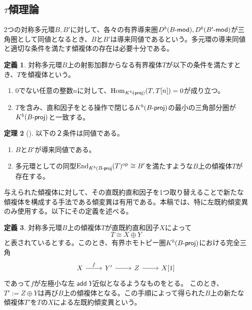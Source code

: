 \documentclass[a4paper,uplatex,dvipdfmx]{jsarticle}
\theoremstyle{definition}
\newtheorem{theorem}{定理}[section]
\newtheorem{definition}[theorem]{定義}
\newcommand{\lmod}{\operatorname{\mathsf{\hspace{-2pt}-mod}}}
\newcommand{\lproj}{\operatorname{\mathsf{\hspace{-2pt}-proj}}}
\newcommand{\opo}{\operatorname{\mathrm{op}}}
\newcommand{\End}{\operatorname{End}\nolimits}
\newcommand{\Hom}{\operatorname{Hom}\nolimits}
\newcommand{\add}{\operatorname{\mathsf{add}}}
\begin{document}
\subsection{\texorpdfstring{\(\tau\)}{τ}傾理論}
2つの対称多元環\(B,B'\)に対して、各々の有界導来圏\(D^b(B\lmod), D^b(B'\lmod)\)が三角圏として同値となるとき、\(B\)と\(B'\)は導来同値であるという。多元環の導来同値と適切な条件を満たす傾複体の存在は必要十分である。
\begin{definition}
  対称多元環\(B\)上の射影加群からなる有界複体\(T\)が以下の条件を満たすとき、\(T\)を傾複体という。
  \begin{enumerate}
    \item \(0\)でない任意の整数\(n\)に対して、\(\Hom_{K^b(\lproj)}(T,T[n])=0\)が成り立つ。
    \item \(T\)を含み、直和因子をとる操作で閉じる\(K^b(B\lproj)\)の最小の三角部分圏が\(K^b(B\lproj)\)と一致する。
  \end{enumerate}
\end{definition}
\begin{theorem}[{\cite{MR1002456}}]\label{Ric Derived eq}
  以下の２条件は同値である。
  \begin{enumerate}
    \item \(B\)と\(B'\)が導来同値である。
    \item 多元環としての同型\(\End_{K^b(B\lproj}(T)^{\opo} \cong B'\)を満たすような\(B\)上の傾複体\(T\)が存在する。
  \end{enumerate}
\end{theorem}
与えられた傾複体に対して、その直既約直和因子を1つ取り替えることで新たな傾複体を構成する手法である傾変異は有用である。本稿では、特に左既約傾変異のみ使用する。以下にその定義を述べる。
\begin{definition}
  対称多元環\(B\)上の傾複体\(T\)が直既約直和因子\(X\)によって
  \begin{equation}
    T\cong X\oplus Y
  \end{equation}
  と表されているとする。このとき、有界ホモトピー圏\(K^b(B\lproj)\)における完全三角
  \begin{equation}
    \begin{tikzcd}
      X\ar[r,"f"]&Y'\ar[r]&Z\ar[r]&X[1]
    \end{tikzcd}
  \end{equation}
  であって\(f\)が左極小な左\(\add Y\)近似となるようなものをとる。
  このとき、\(T':=Z\oplus Y\)は再び\(B\)上の傾複体となる。この手順によって得られた\(B\)上の新たな傾複体\(T'\)を\(T\)の\(X\)による左既約傾変異という。
\end{definition}
\end{document}
